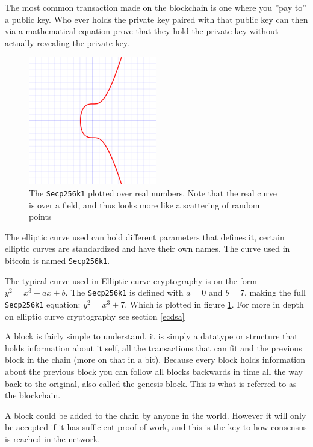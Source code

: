 The most common transaction made on the blockchain is one where you ''pay to'' a public key. Who ever holds the private key paired with that public key can then via a mathematical equation prove that they hold the private key without actually revealing the private key.\cite{quantabytes}

\begin{figure}[H]
	\centering
	\includegraphics[width=0.5\textwidth]{introduction/images/Secp256k1.png}
	\caption{The \texttt{Secp256k1} plotted over real numbers. Note that the real curve is over a field, and thus looks more like a scattering of random points}
	\label{fig:eccbasic}
\end{figure}

The elliptic curve used can hold different parameters that defines it, certain elliptic curves are standardized and have their own names. The curve used in bitcoin is named \texttt{Secp256k1}.\cite{Secp256k1_def}\cite{antonopoulos_2017}

The typical curve used in Elliptic curve cryptography is on the form $y^2=x^3+ax+b$. The \texttt{Secp256k1} is defined with $a=0$ and $b=7$, making the full \texttt{Secp256k1} equation: $y^2=x^3+7$. Which is plotted in figure \ref*{fig:eccbasic}. For more in depth on elliptic curve cryptography see section \ref{ecdsa}

A block is fairly simple to understand, it is simply a datatype or structure that holds information about it self, all the transactions that can fit and the previous block in the chain (more on that in a bit). Because every block holds information about the previous block you can follow all blocks backwards in time all the way back to the original, also called the genesis block.\cite{genesis} This is what is referred to as the blockchain. 

A block could be added to the chain by anyone in the world. However it will only be accepted if it has sufficient proof of work, and this is the key to how consensus is reached in the network.\cite{antonopoulos_2017}

